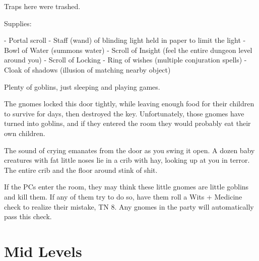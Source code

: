 \begin{multicols}{2}

Traps here were trashed.

Supplies:

- Portal scroll
- Staff (wand) of blinding light held in paper to limit the light
- Bowl of Water (summons water)
- Scroll of Insight (feel the entire dungeon level around you)
- Scroll of Locking
- Ring of wishes (multiple conjuration spells)
- Cloak of shadows (illusion of matching nearby object)

\goblinnuramancer

\goblin


Plenty of goblins, just sleeping and playing games.

\goblin


\begin{exampletext}

	The gnomes locked this door tightly, while leaving enough food for their children to survive for days, then destroyed the key.
	Unfortunately, those gnomes have turned into goblins, and if they entered the room they would probably eat their own children.

\end{exampletext}

\begin{boxtext}

	The sound of crying emanates from the door as you swing it open.
	A dozen baby creatures with fat little noses lie in a crib with hay, looking up at you in terror.
	The entire crib and the floor around stink of shit.

\end{boxtext}

If the PCs enter the room, they may think these little gnomes are little goblins and kill them.
If any of them try to do so, have them roll a Wits + Medicine check to realize their mistake, TN 8.
Any gnomes in the party will automatically pass this check.

\end{multicols}


\label{laddertop}

\section{Mid Levels}

